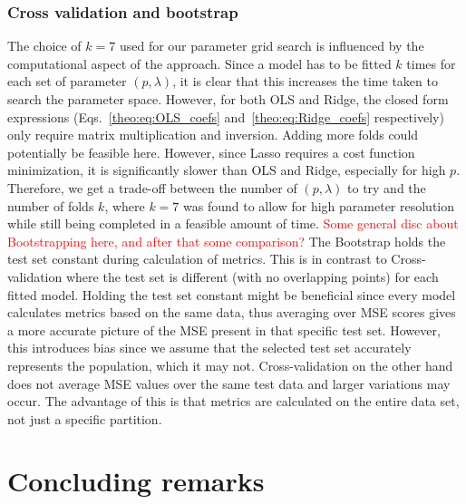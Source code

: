 \documentclass[twocolumn,english,notitlepage]{article}
\newcommand{\comment}[1]{\textcolor{red}{#1}}
\begin{document}
        \subsubsection*{Cross validation and bootstrap} 
            The choice of $k=7$ used for our parameter grid search is influenced by the computational aspect of the approach. Since a model has to be fitted $k$ times for each set of parameter $(p,\lambda)$, it is clear that this increases the time taken to search the parameter space. However, for both OLS and Ridge, the closed form expressions (Eqs.~\eqref{theo:eq:OLS_coefs} and~\eqref{theo:eq:Ridge_coefs} respectively) only require matrix multiplication and inversion. Adding more folds could potentially be feasible here. However, since Lasso requires a cost function minimization, it is significantly slower than OLS and Ridge, especially for high $p$. Therefore, we get a trade-off between the number of $(p,\lambda)$ to try and the number of folds $k$, where $k=7$ was found to allow for high parameter resolution while still being completed in a feasible amount of time.
            \newline
            \comment{Some general disc about Bootstrapping here, and after that some comparison?}
            \newline
            The Bootstrap holds the test set constant during calculation of metrics. This is in contrast to Cross-validation where the test set is different (with no overlapping points) for each fitted model. Holding the test set constant might be beneficial since every model calculates metrics based on the same data, thus averaging over MSE scores gives a more accurate picture of the MSE present in that specific test set. However, this introduces bias since we assume that the selected test set accurately represents the population, which it may not. Cross-validation on the other hand does not average MSE values over the same test data and larger variations may occur. The advantage of this is that metrics are calculated on the entire data set, not just a specific partition.          

\section{Concluding remarks}
\end{document}
